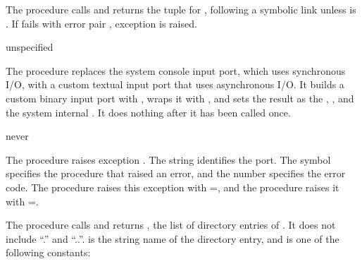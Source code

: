 The  procedure calls  and returns
the  tuple for , following a symbolic link
unless  is . If  fails
with error pair , exception
 is raised.

\begin{procedure}
\end{procedure}
\returns{} unspecified

The  procedure replaces the system console
input port, which uses synchronous I/O, with a custom textual input
port that uses asynchronous I/O. It builds a custom binary input port
with , wraps it with , and
sets the result as the ,
, and the system internal
. It does nothing after it has been called
once.

\begin{procedure}
\end{procedure}
\returns{} never

The  procedure raises exception .  The string 
identifies the port.  The symbol  specifies the procedure
that raised an error, and the number  specifies the error
code.  The  procedure raises this exception with
=, and the 
procedure raises it with =.

\begin{procedure}
\end{procedure}
\returns{} 

The  procedure calls 
and returns , the list of
directory entries of . It does not include ``.'' and
``..''.  is the string name of the directory entry, and
 is one of the following constants:


